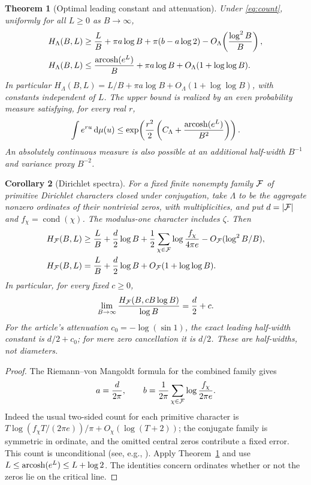 \documentclass[11pt]{article}
\newtheorem{theorem}{Theorem}[section]
\newtheorem{corollary}[theorem]{Corollary}
\theoremstyle{definition}\newtheorem{definition}[theorem]{Definition}
\begin{document}
\begin{theorem}[Optimal leading constant and attenuation]\label{thm:main}
Under \eqref{eq:count}, uniformly for all $L\ge0$ as $B\to\infty$,
\begin{align}
 H_\Lambda(B,L)&\ge \frac{L}{B}+\pi a\log B+\pi(b-a\log2)-O_\Lambda\!\left(\frac{\log^2 B}{B}\right),\label{eq:lb}\\
 H_\Lambda(B,L)&\le \frac{\operatorname{arcosh}(e^L)}{B}+\pi a\log B+O_\Lambda(1+\log\log B).\label{eq:ub}
\end{align}
In particular $H_\Lambda(B,L)=L/B+\pi a\log B+O_\Lambda(1+\log\log B)$, with constants independent of $L$. The upper bound is realized by an even probability measure satisfying, for every real $r$,
\begin{equation}\label{eq:mgf}
 \int e^{ru}\,\mathrm d\mu(u)\le\exp\!\left(\frac{r^2}{2}\left(C_\Lambda+\frac{\operatorname{arcosh}(e^L)}{B^2}\right)\right).
\end{equation}
An absolutely continuous measure is also possible at an additional half-width $B^{-1}$ and variance proxy $B^{-2}$.
\end{theorem}

\begin{corollary}[Dirichlet spectra]\label{cor:dir}
For a fixed finite nonempty family $\mathcal F$ of primitive Dirichlet characters closed under conjugation, take $\Lambda$ to be the aggregate nonzero ordinates of their nontrivial zeros, with multiplicities, and put $d=|\mathcal F|$ and $f_\chi=\operatorname{cond}(\chi)$. The modulus-one character includes $\zeta$. Then
\begin{align*}
 H_{\mathcal F}(B,L)&\ge \frac{L}{B}+\frac d2\log B+\frac12\sum_{\chi\in\mathcal F}\log\frac{f_\chi}{4\pi e}-O_{\mathcal F}(\log^2 B/B),\\
 H_{\mathcal F}(B,L)&=\frac{L}{B}+\frac d2\log B+O_{\mathcal F}(1+\log\log B).
\end{align*}
In particular, for every fixed $c\ge0$,
\[
 \lim_{B\to\infty}\frac{H_{\mathcal F}(B,cB\log B)}{\log B}=\frac d2+c.
\]
For the article's attenuation $c_0=-\log(\sin1)$, the exact leading half-width constant is $d/2+c_0$; for mere zero cancellation it is $d/2$. These are half-widths, not diameters.
\end{corollary}
\begin{proof}
The Riemann--von Mangoldt formula for the combined family gives
\[
 a=\frac d{2\pi},\qquad b=\frac{1}{2\pi}\sum_{\chi\in\mathcal F}\log\frac{f_\chi}{2\pi e}.
\]
Indeed the usual two-sided count for each primitive character is $T\log(f_\chi T/(2\pi e))/\pi+O_{\chi}(\log(T+2))$; the conjugate family is symmetric in ordinate, and the omitted central zeros contribute a fixed error. This count is unconditional (see, e.g., \cite{davenport,mv}). Apply Theorem~\ref{thm:main} and use $L\le\operatorname{arcosh}(e^L)\le L+\log2$. The identities concern ordinates whether or not the zeros lie on the critical line.
\end{proof}
\end{document}
